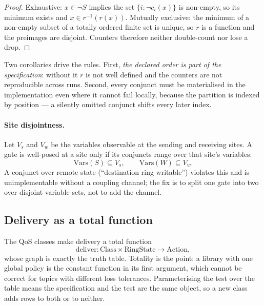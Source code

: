 \documentclass[11pt]{article}
\begin{document}
\begin{proof}
Exhaustive: $x \in \neg S$ implies the set $\{i : \neg c_i(x)\}$ is non-empty,
so its minimum exists and $x \in r^{-1}(r(x))$. Mutually exclusive: the minimum
of a non-empty subset of a totally ordered finite set is unique, so $r$ is a
function and the preimages are disjoint. Counters therefore neither
double-count nor lose a drop.
\end{proof}

Two corollaries drive the rules. First, \emph{the declared order is part of the
specification}: without it $r$ is not well defined and the counters are not
reproducible across runs. Second, every conjunct must be materialised in the
implementation even where it cannot fail locally, because the partition is
indexed by position --- a silently omitted conjunct shifts every later index.

\paragraph{Site disjointness.} Let $V_s$ and $V_w$ be the variables observable
at the sending and receiving sites. A gate is well-posed at a site only if
its conjuncts range over that site's variables:
\begin{equation}
\mathrm{Vars}(S) \subseteq V_s, \qquad \mathrm{Vars}(W) \subseteq V_w .
\end{equation}
A conjunct over remote state (``destination ring writable'') violates this and
is unimplementable without a coupling channel; the fix is to split one gate
into two over disjoint variable sets, not to add the channel.

\subsection{Delivery as a total function}
\label{lbl:HS-GATE-03}

The QoS classes make delivery a total function
\begin{equation}
\mathrm{deliver} : \mathrm{Class} \times \mathrm{RingState} \to \mathrm{Action},
\end{equation}
whose graph is exactly the truth table. Totality is the point: a library with
one global policy is the constant function in its first argument, which cannot
be correct for topics with different loss tolerances. Parameterising the test
over the table means the specification and the test are the same object, so a
new class adds rows to both or to neither.
\end{document}
